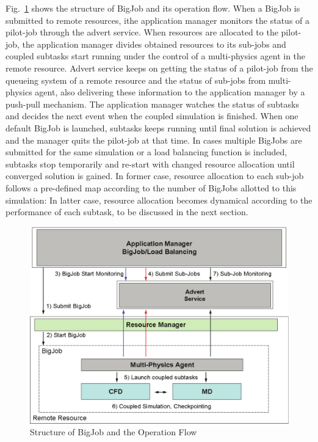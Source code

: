 \documentclass[conference,final]{IEEEtran}
\begin{document}
Fig.~\ref{Fig:BigJob_Structure} shows the structure of BigJob and its operation flow. When a BigJob is submitted to remote resources, ithe application manager monitors the status of a pilot-job through the advert service. When resources are allocated to the pilot-job, the application manager divides obtained resources to its sub-jobs and coupled subtasks start running under the control of a multi-physics agent in the remote resource. Advert service keeps on getting the status of a pilot-job from the queueing system of a remote resource and the status of sub-jobs from multi-physics agent, also delivering these information to the application manager by a push-pull mechanism. The application manager watches the status of subtasks and decides the next event when the coupled simulation is finished. When one default BigJob is launched, subtasks keeps running until final solution is achieved and the manager quits the pilot-job at that time. In cases multiple BigJobs are submitted for the same simulation or a load balancing function is included, subtasks stop temporarily and re-start with changed resource allocation until converged solution is gained. In former case, resource allocation to each sub-job follows a pre-defined map according to the number of BigJobs allotted to this simulation: In latter case, resource allocation becomes dynamical according to the performance of each subtask, to be discussed in the next section.

\begin{figure}
\centering
\includegraphics[scale=0.40]{Structure_of_BigJob}
\caption{\small Structure of BigJob and the Operation Flow}
\label{Fig:BigJob_Structure}
\end{figure}
\end{document}
